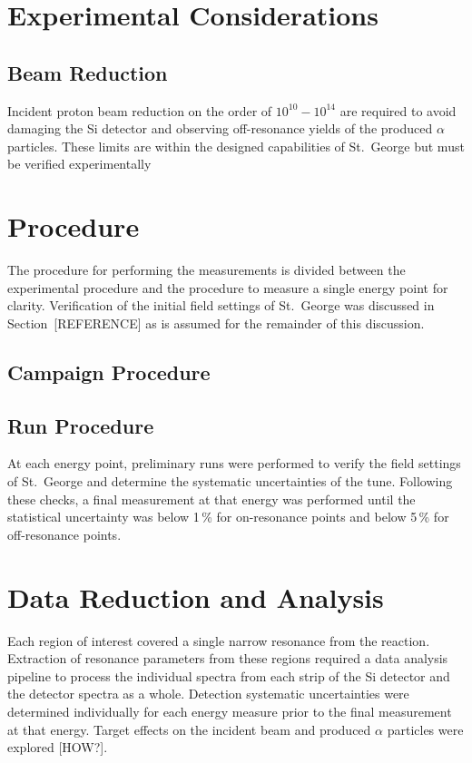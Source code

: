 \section{Experimental Considerations}

\subsection{Beam Reduction}
Incident proton beam reduction on the order of $10^{10} - 10^{14}$ are required
to avoid damaging the Si detector and observing off-resonance yields of the
produced $\alpha$ particles. These limits are within the designed capabilities
of St.\ George but must be verified experimentally




\section{Procedure}

The procedure for performing the \alpa{} measurements is divided between the
experimental procedure and the procedure to measure a single energy point for
clarity. Verification of the initial field settings of St.\ George was
discussed in Section~[REFERENCE] as is assumed for the remainder of this
discussion.

\subsection{Campaign Procedure}



\subsection{Run Procedure}

At each energy point, preliminary runs were performed to verify the field
settings of St.\ George and determine the systematic uncertainties of the tune.
Following these checks, a final measurement at that energy was performed until
the statistical uncertainty was below 1\,\% for on-resonance points and below
5\,\% for off-resonance points.




\section{Data Reduction and Analysis}

Each region of interest covered a single narrow resonance from the \alpa{}
reaction. Extraction of resonance parameters from these regions required a
data analysis pipeline to process the individual spectra from each strip of
the Si detector and the detector spectra as a whole. Detection systematic
uncertainties were determined individually for each energy measure prior to
the final measurement at that energy. Target effects on the incident beam
and produced $\alpha$ particles were explored [HOW?].

